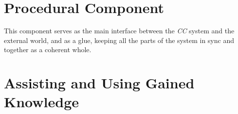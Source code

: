 \section{Procedural Component}
\label{section:prophet}
This component serves as the main interface between the \emph{CC} system and
the external world, and as a glue, keeping all the parts of the system in sync
and together as a coherent whole.

\section{Assisting and Using Gained Knowledge}
\label{section:usage}
